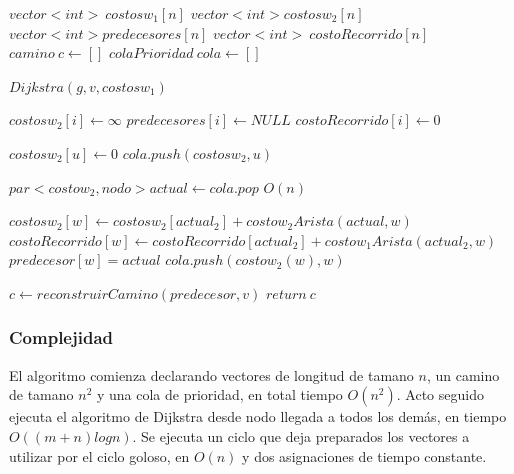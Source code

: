 \begin{algorithmic}[1]
\Statex


\State $ vector<int> \: costosw_1[n] $
\State $vector<int> costosw_2[n]$
\State $vector<int> predecesores[n]$
\State $ vector<int> \: costoRecorrido[n] $
\State $camino \: c \gets [] $
\State $colaPrioridad \: cola \gets []$

\Statex

\State $ Dijkstra(g, v, costosw_1) $

\Statex

	\State $ costosw_2[i] \gets \infty $
	\State $ predecesores[i] \gets NULL $
	\State $ costoRecorrido[i] \gets 0 $	
\EndFor

\State $ costosw_2[u] \gets 0 $
\Statex
\State $ cola.push(costosw_2, u) $

	\State $ par<costow_2, nodo> actual \gets cola.pop $
		\Comment $ O(n)$
		

			\State $ costosw_2[w] \gets costosw_2[actual_2] + costow_2Arista(actual,w) $
			\State $ costoRecorrido[w] \gets costoRecorrido[actual_2] + costow_1Arista(actual_2,w) $
			\State $ predecesor[w] = actual $
			\State $cola.push(costow_2(w), w)$


			\EndIf

		\EndIf
	\EndFor

\EndWhile

\State $ c \gets reconstruirCamino(predecesor,v) $
\State $ return \:c $

\EndProcedure
\end{algorithmic}


\subsubsection{Complejidad}

El algoritmo comienza declarando vectores de longitud de tamano $n$, un camino de tamano $n^2$ y una cola de prioridad, en total tiempo $O(n^2)$. Acto seguido ejecuta el algoritmo de Dijkstra desde nodo llegada a todos los dem\'as, en tiempo $O((m+n)log n)$. Se ejecuta un ciclo que deja preparados los vectores a utilizar por el ciclo goloso, en $O(n)$ y dos asignaciones de tiempo constante.


